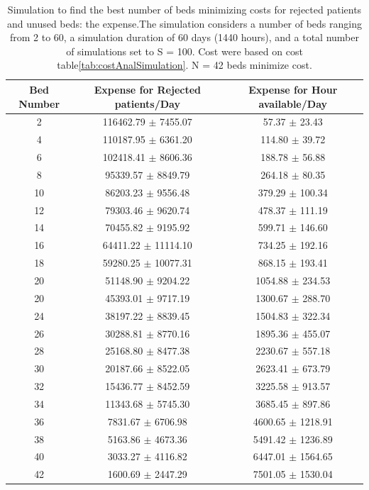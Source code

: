 \documentclass[12pt]{article}
\begin{document}
\begin{table}[H]
\captionsetup{skip=10pt}
\centering
\caption{Simulation to find the best number of beds minimizing costs for rejected patients and unused beds: the expense.The simulation considers a number of beds ranging from 2 to 60, a simulation duration of 60 days (1440 hours), and a total number of simulations set to S = 100. Cost were based on cost table\ref{tab:costAnalSimulation}. N = 42 beds minimize cost.}
\label{tab:bestFixBedSimulationCost}
\begin{tabular}{ccc}
\hline
 Bed Number & Expense for Rejected patients/Day & Expense for Hour available/Day \\
\hline
2 & 116462.79 $\pm$ 7455.07 & 57.37 $\pm$ 23.43 \\
4 & 110187.95 $\pm$ 6361.20 & 114.80 $\pm$ 39.72 \\
6 & 102418.41 $\pm$ 8606.36 & 188.78 $\pm$ 56.88 \\
8 & 95339.57 $\pm$ 8849.79 & 264.18 $\pm$ 80.35 \\
10 & 86203.23 $\pm$ 9556.48 & 379.29 $\pm$ 100.34 \\
12 & 79303.46 $\pm$ 9620.74 & 478.37 $\pm$ 111.19 \\
14 & 70455.82 $\pm$ 9195.92 & 599.71 $\pm$ 146.60 \\
16 & 64411.22 $\pm$ 11114.10 & 734.25 $\pm$ 192.16 \\
18 & 59280.25 $\pm$ 10077.31 & 868.15 $\pm$ 193.41 \\
20 & 51148.90 $\pm$ 9204.22 & 1054.88 $\pm$ 234.53 \\
20 & 45393.01 $\pm$ 9717.19 & 1300.67 $\pm$ 288.70 \\
24 & 38197.22 $\pm$ 8839.45 & 1504.83 $\pm$ 322.34 \\
26 & 30288.81 $\pm$ 8770.16 & 1895.36 $\pm$ 455.07 \\
28 & 25168.80 $\pm$ 8477.38 & 2230.67 $\pm$ 557.18 \\
30 & 20187.66 $\pm$ 8522.05 & 2623.41 $\pm$ 673.79 \\ 
32 & 15436.77 $\pm$ 8452.59 & 3225.58 $\pm$ 913.57 \\
34 & 11343.68 $\pm$ 5745.30 & 3685.45 $\pm$ 897.86 \\
36 & 7831.67 $\pm$ 6706.98 & 4600.65 $\pm$ 1218.91 \\
38 & 5163.86 $\pm$ 4673.36 & 5491.42 $\pm$ 1236.89 \\
40 & 3033.27 $\pm$ 4116.82 & 6447.01 $\pm$ 1564.65 \\
\rowcolor{Gray}
42 & 1600.69 $\pm$ 2447.29 & 7501.05 $\pm$ 1530.04 \\

\end{tabular}
\end{table}
\end{document}
